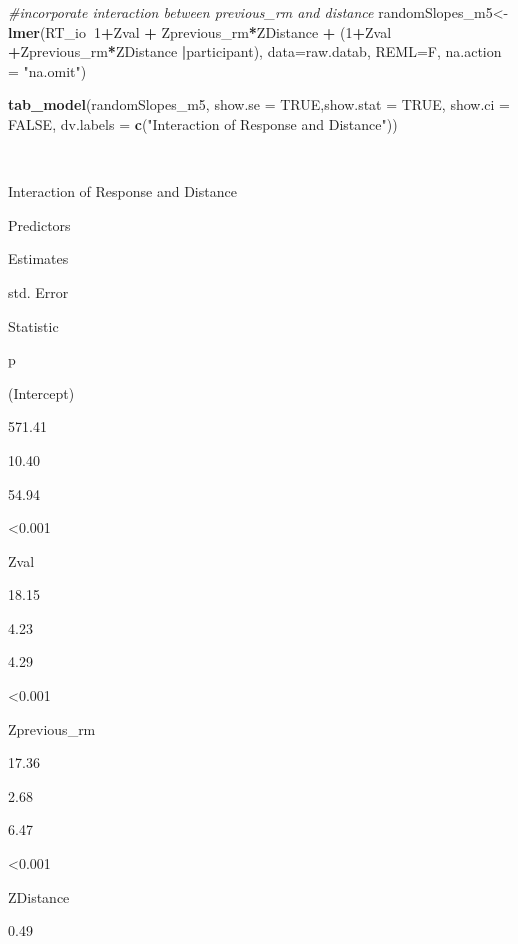 \documentclass[
]{article}
\newenvironment{Shaded}{\begin{snugshade}}{\end{snugshade}}
\newcommand{\CommentTok}[1]{\textcolor[rgb]{0.56,0.35,0.01}{\textit{#1}}}
\newcommand{\DataTypeTok}[1]{\textcolor[rgb]{0.13,0.29,0.53}{#1}}
\newcommand{\DecValTok}[1]{\textcolor[rgb]{0.00,0.00,0.81}{#1}}
\newcommand{\KeywordTok}[1]{\textcolor[rgb]{0.13,0.29,0.53}{\textbf{#1}}}
\newcommand{\NormalTok}[1]{#1}
\newcommand{\OperatorTok}[1]{\textcolor[rgb]{0.81,0.36,0.00}{\textbf{#1}}}
\newcommand{\OtherTok}[1]{\textcolor[rgb]{0.56,0.35,0.01}{#1}}
\newcommand{\StringTok}[1]{\textcolor[rgb]{0.31,0.60,0.02}{#1}}
\begin{document}
\begin{Shaded}
\begin{Highlighting}[]
\CommentTok{#incorporate interaction between previous_rm and distance}
\NormalTok{randomSlopes_m5<-}\KeywordTok{lmer}\NormalTok{(RT_io}\OperatorTok{~}\DecValTok{1}\OperatorTok{+}\NormalTok{Zval }\OperatorTok{+}\StringTok{ }\NormalTok{Zprevious_rm}\OperatorTok{*}\NormalTok{ZDistance }\OperatorTok{+}\StringTok{ }\NormalTok{(}\DecValTok{1}\OperatorTok{+}\NormalTok{Zval }\OperatorTok{+}\NormalTok{Zprevious_rm}\OperatorTok{*}\NormalTok{ZDistance }\OperatorTok{|}\NormalTok{participant), }
                      \DataTypeTok{data=}\NormalTok{raw.datab, }
                      \DataTypeTok{REML=}\NormalTok{F,}
                      \DataTypeTok{na.action =} \StringTok{"na.omit"}\NormalTok{)}



\KeywordTok{tab_model}\NormalTok{(randomSlopes_m5, }\DataTypeTok{show.se =} \OtherTok{TRUE}\NormalTok{,}\DataTypeTok{show.stat =} \OtherTok{TRUE}\NormalTok{, }\DataTypeTok{show.ci =} \OtherTok{FALSE}\NormalTok{, }
                  \DataTypeTok{dv.labels =} \KeywordTok{c}\NormalTok{(}\StringTok{"Interaction of Response and Distance"}\NormalTok{))}
\end{Highlighting}
\end{Shaded}

~

Interaction of Response and Distance

Predictors

Estimates

std. Error

Statistic

p

(Intercept)

571.41

10.40

54.94

\textless0.001

Zval

18.15

4.23

4.29

\textless0.001

Zprevious\_rm

17.36

2.68

6.47

\textless0.001

ZDistance

0.49
\end{document}
